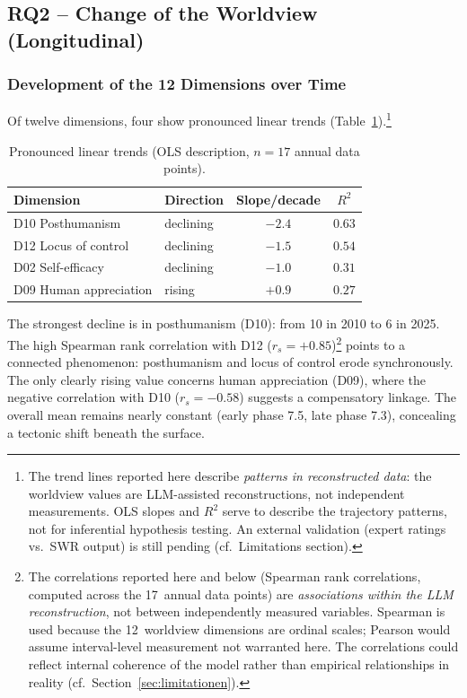 \documentclass[12pt,a4paper]{article}
\begin{document}
\subsection{RQ2 -- Change of the Worldview (Longitudinal)}
\label{sec:ergebnisse:f2}

\subsubsection{Development of the 12 Dimensions over Time}

Of twelve dimensions, four show pronounced linear trends (Table~\ref{tab:trends}).\footnote{The trend lines reported here describe \textit{patterns in reconstructed data}: the worldview values are LLM-assisted reconstructions, not independent measurements. OLS slopes and $R^2$ serve to describe the trajectory patterns, not for inferential hypothesis testing. An external validation (expert ratings vs.\ SWR output) is still pending (cf.\ Limitations section).}

\begin{table}[htbp]
  \centering
  \caption{Pronounced linear trends (OLS description, $n=17$ annual data points).}
  \label{tab:trends}
  \begin{tabular}{l l c c}
    \toprule
    \textbf{Dimension} & \textbf{Direction} & \textbf{Slope/decade} & $R^2$ \\
    \midrule
    D10 Posthumanism          & declining & $-2.4$ & $0.63$ \\
    D12 Locus of control      & declining & $-1.5$ & $0.54$ \\
    D02 Self-efficacy          & declining & $-1.0$ & $0.31$ \\
    D09 Human appreciation     & rising    & $+0.9$ & $0.27$ \\
    \bottomrule
  \end{tabular}
\end{table}

The strongest decline is in posthumanism (D10): from 10 in 2010 to 6 in 2025. The high Spearman rank correlation with D12 ($r_s = +0.85$)\footnote{The correlations reported here and below (Spearman rank correlations, computed across the 17~annual data points) are \emph{associations within the LLM reconstruction}, not between independently measured variables. Spearman is used because the 12~worldview dimensions are ordinal scales; Pearson would assume interval-level measurement not warranted here. The correlations could reflect internal coherence of the model rather than empirical relationships in reality (cf.\ Section~\ref{sec:limitationen}).} points to a connected phenomenon: posthumanism and locus of control erode synchronously. The only clearly rising value concerns human appreciation (D09), where the negative correlation with D10 ($r_s = -0.58$) suggests a compensatory linkage. The overall mean remains nearly constant (early phase 7.5, late phase 7.3), concealing a tectonic shift beneath the surface.
\end{document}

